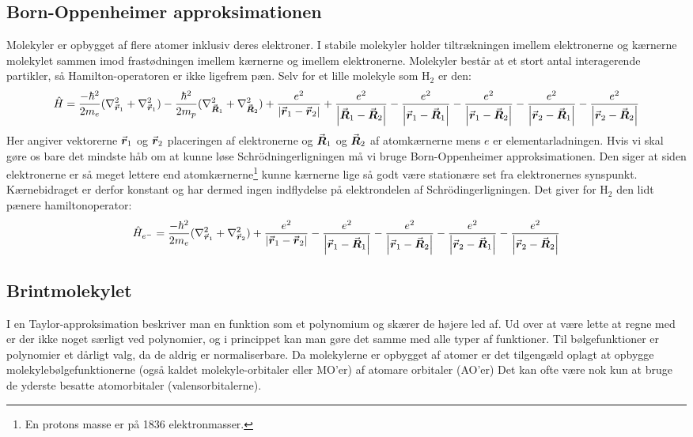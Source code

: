 \documentclass[../main.tex]{subfiles}
\begin{document}
\subsection{Born-Oppenheimer approksimationen}
Molekyler er opbygget af flere atomer inklusiv deres elektroner. I stabile molekyler holder tiltrækningen imellem elektronerne og kærnerne molekylet sammen imod frastødningen imellem kærnerne og imellem elektronerne. Molekyler består at et stort antal interagerende partikler, så Hamilton-operatoren er ikke ligefrem pæn. Selv for et lille molekyle som H$_2$ er den:
\begin{equation*}
    \hat H = \frac{-\hbar^2}{2m_e}(\nabla_{{\vec{\boldsymbol{r}}}_1}^2+\nabla_{{\vec{\boldsymbol{r}}}_1}^2)-\frac{\hbar^2}{2m_p}(\nabla_{{\vec{\boldsymbol{R}}}_1}^2+\nabla_{{\vec{\boldsymbol{R}}}_2}^2)+\frac{e^2}{\left| {\vec{\boldsymbol{r}}}_1-{\vec{\boldsymbol{r}}}_2 \right|}+\frac{e^2}{\left| {\vec{\boldsymbol{R}}}_1-{\vec{\boldsymbol{R}}}_2 \right|}-\frac{e^2}{\left| {\vec{\boldsymbol{r}}}_1-{\vec{\boldsymbol{R}}}_1 \right|}-\frac{e^2}{\left| {\vec{\boldsymbol{r}}}_1-{\vec{\boldsymbol{R}}}_2 \right|}-\frac{e^2}{\left| {\vec{\boldsymbol{r}}}_2-{\vec{\boldsymbol{R}}}_1 \right|}-\frac{e^2}{\left| {\vec{\boldsymbol{r}}}_2-{\vec{\boldsymbol{R}}}_2 \right|}
\end{equation*}
Her angiver vektorerne ${\vec{\boldsymbol{r}}}_1$ og ${\vec{\boldsymbol{r}}}_2$ placeringen af elektronerne og ${\vec{\boldsymbol{R}}}_1$ og ${\vec{\boldsymbol{R}}}_2$ af atomkærnerne mens $e$ er elementarladningen.
Hvis vi skal gøre os bare det mindste håb om at kunne løse Schrödningerligningen må vi bruge Born-Oppenheimer approksimationen. Den siger at siden elektronerne er så meget lettere end atomkærnerne\footnote{En protons masse er på 1836 elektronmasser.} kunne kærnerne lige så godt være stationære set fra elektronernes synspunkt. Kærnebidraget er derfor konstant og har dermed ingen indflydelse på elektrondelen af Schrödingerligningen. Det giver for H$_2$ den lidt pænere hamiltonoperator:
\begin{equation}
    \hat H_{e^-} = \frac{-\hbar^2}{2m_e}(\nabla_{{\vec{\boldsymbol{r}}}_1}^2+\nabla_{{\vec{\boldsymbol{r}}}_2}^2)+\frac{e^2}{\left| {\vec{\boldsymbol{r}}}_1-{\vec{\boldsymbol{r}}}_2 \right|}-\frac{e^2}{\left| {\vec{\boldsymbol{r}}}_1-{\vec{\boldsymbol{R}}}_1 \right|}-\frac{e^2}{\left| {\vec{\boldsymbol{r}}}_1-{\vec{\boldsymbol{R}}}_2 \right|}-\frac{e^2}{\left| {\vec{\boldsymbol{r}}}_2-{\vec{\boldsymbol{R}}}_1 \right|}-\frac{e^2}{\left| {\vec{\boldsymbol{r}}}_2-{\vec{\boldsymbol{R}}}_2 \right|}
\end{equation}
\subsection{Brintmolekylet}

I en Taylor-approksimation beskriver man en funktion som et polynomium og skærer de højere led af.
Ud over at være lette at regne med er der ikke noget særligt ved polynomier, og i princippet kan man
gøre det samme med alle typer af funktioner. Til bølgefunktioner er polynomier et dårligt valg, da de
aldrig er normaliserbare. Da molekylerne er opbygget af atomer er det tilgengæld oplagt at opbygge
molekylebølgefunktionerne (også kaldet molekyle-orbitaler eller MO’er) af atomare orbitaler (AO’er)
Det kan ofte være nok kun at bruge de yderste besatte atomorbitaler (valensorbitalerne).
\end{document}
